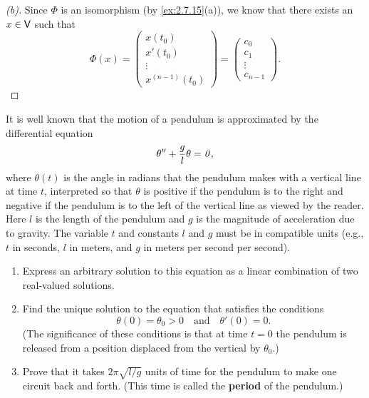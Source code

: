 \begin{proof}[(b)]
  Since \(\Phi\) is an isomorphism (by \cref{ex:2.7.15}(a)), we know that there exists an \(x \in \mathsf{V}\) such that
  \[
    \Phi(x) = \begin{pmatrix}
      x(t_0)  \\
      x'(t_0) \\
      \vdots  \\
      x^{(n - 1)}(t_0)
    \end{pmatrix} = \begin{pmatrix}
      c_0    \\
      c_1    \\
      \vdots \\
      c_{n - 1}
    \end{pmatrix}.
  \]
\end{proof}

\begin{ex}\label{ex:2.7.16}
  It is well known that the motion of a pendulum is approximated by the differential equation
  \[
    \theta'' + \dfrac{g}{l} \theta = \mathit{0},
  \]
  where \(\theta(t)\) is the angle in radians that the pendulum makes with a vertical line at time \(t\), interpreted so that \(\theta\) is positive if the pendulum is to the right and negative if the pendulum is to the left of the vertical line as viewed by the reader.
  Here \(l\) is the length of the pendulum and \(g\) is the magnitude of acceleration due to gravity.
  The variable \(t\) and constants \(l\) and \(g\) must be in compatible units
  (e.g., \(t\) in seconds, \(l\) in meters, and \(g\) in meters per second per second).
  \begin{enumerate}
    \item Express an arbitrary solution to this equation as a linear combination of two real-valued solutions.
    \item Find the unique solution to the equation that satisfies the conditions
          \[
            \theta(0) = \theta_0 > 0 \quad \text{and} \quad \theta'(0) = 0.
          \]
          (The significance of these conditions is that at time \(t = 0\) the pendulum is released from a position displaced from the vertical by \(\theta_0\).)
    \item Prove that it takes \(2 \pi \sqrt{l / g}\) units of time for the pendulum to make one circuit back and forth.
          (This time is called the \textbf{period} of the pendulum.)
  \end{enumerate}
\end{ex}

